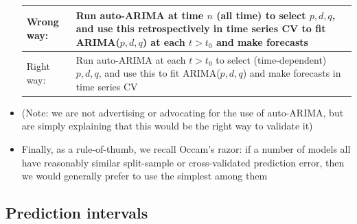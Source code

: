 \documentclass{article}
\begin{document}
\begin{itemize}
\begin{center}
\begin{tabular}{|l|l|}
\hline
Wrong way: & 
\parbox[c]{0.77\textwidth}{ \smallskip
Run auto-ARIMA at time $n$ (all time) to select $p,d,q$, and use this 
retrospectively in time series CV to fit ARIMA($p,d,q$) at each $t > t_0$ and
make forecasts \smallskip}  
\\ \hline
Right way: & 
\parbox[c]{0.77\textwidth}{ \smallskip
Run auto-ARIMA at each $t > t_0$ to select (time-dependent) $p,d,q$, and use
this to fit ARIMA($p,d,q$) and make forecasts in time series CV \smallskip} 
\\ \hline
\end{tabular}  
\end{center}

\item (Note: we are not advertising or advocating for the use of auto-ARIMA, but
  are simply explaining that this would be the right way to validate it) 

\item Finally, as a rule-of-thumb, we recall Occam's razor: if a number of
  models all have reasonably similar split-sample or cross-validated prediction
  error, then we would generally prefer to use the simplest among them 
\end{itemize}

\subsection{Prediction intervals}
\end{document}
